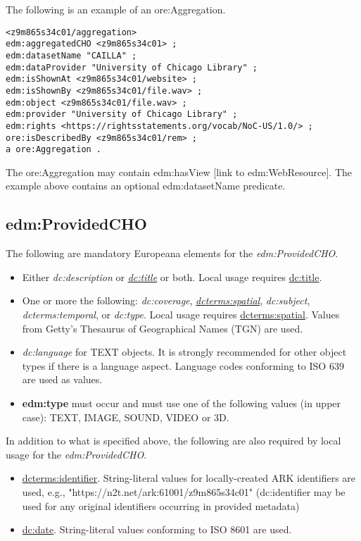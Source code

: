 \documentclass[11pt]{article}
\begin{document}

The following is an example of an ore:Aggregation.

\begin{verbatim}
<z9m865s34c01/aggregation>
edm:aggregatedCHO <z9m865s34c01> ;
edm:datasetName "CAILLA" ;
edm:dataProvider "University of Chicago Library" ;
edm:isShownAt <z9m865s34c01/website> ;
edm:isShownBy <z9m865s34c01/file.wav> ;
edm:object <z9m865s34c01/file.wav> ;
edm:provider "University of Chicago Library" ;
edm:rights <https://rightsstatements.org/vocab/NoC-US/1.0/> ;
ore:isDescribedBy <z9m865s34c01/rem> ;
a ore:Aggregation .
\end{verbatim}  

The ore:Aggregation may contain edm:hasView [link to edm:WebResource]. The example above contains an optional edm:datasetName predicate.

\subsection{edm:ProvidedCHO}
The following are mandatory Europeana elements for the \textit{edm:ProvidedCHO}.

\begin{itemize}

  \item Either \textit{dc:description} or \underline{\textit{dc:title}} or both. Local usage requires \underline{dc:title}.

  \item One or more the following: \textit{dc:coverage}, \underline{\textit{dcterms:spatial}}, \textit{dc:subject}, \textit{dcterms:temporal}, or \textit{dc:type}. Local usage requires \underline{dcterms:spatial}. Values from Getty's Thesaurus of Geographical Names (TGN) are used.

  \item \textit{dc:language} for TEXT objects. It is strongly recommended for other object types if there is a language aspect. Language codes conforming to ISO 639 are used as values.

  \item \textbf{edm:type} must occur and must use one of the following values (in upper case): TEXT, IMAGE, SOUND, VIDEO or 3D.
\end{itemize}

In addition to what is specified above, the following are also required by local usage for the \textit{edm:ProvidedCHO}.
\begin{itemize}
  \item \underline{dcterms:identifier}. String-literal values for locally-created ARK identifiers are used, e.g., "https://n2t.net/ark:61001/z9m865s34c01" (dc:identifier may be used for any original identifiers occurring in provided metadata)

  \item \underline{dc:date}. String-literal values conforming to ISO 8601 are used.

\end{itemize}
\end{document}
